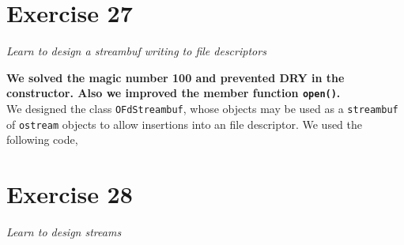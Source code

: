 \documentclass[12pt]{article}
\newcommand{\desc}[1]{\textit{#1} \vspace{1em}}
\begin{document}










\clearpage

\section*{Exercise 27}
\desc{Learn to design a streambuf writing to file descriptors}

\textbf{We solved the magic number 100 and prevented DRY in the constructor. Also we improved the member function \texttt{open()}.}\\

We designed the class \texttt{OFdStreambuf}, whose objects may be used as a \texttt{streambuf} of \texttt{ostream} objects to allow insertions into an file descriptor. We used the following code,












\clearpage

\section*{Exercise 28}
\desc{Learn to design streams}
\end{document}
